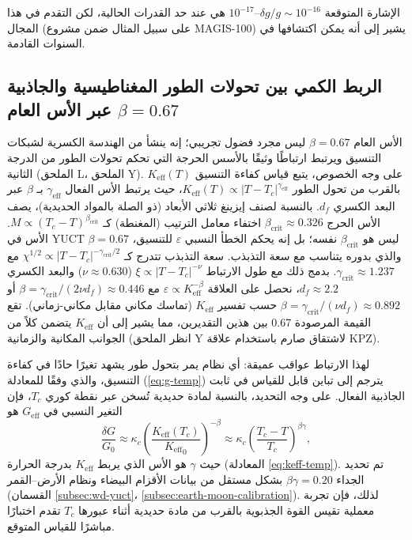 \documentclass[11pt,a4paper]{article}
\newcommand{\Keff}{K_{\mathrm{eff}}}
\begin{document}
	الإشارة المتوقعة $\delta g/g \sim 10^{-16}$–$10^{-17}$ هي عند حد القدرات الحالية، لكن التقدم في هذا المجال (على سبيل المثال ضمن مشروع MAGIS-100) يشير إلى أنه يمكن اكتشافها في السنوات القادمة.
	
	\subsection{الربط الكمي بين تحولات الطور المغناطيسية والجاذبية عبر الأس العام \(\beta = 0.67\)}
	\label{subsec:magnetic-gravity-link}
	
	الأس العام $\beta = 0.67$ ليس مجرد فضول تجريبي؛ إنه ينشأ من الهندسة الكسرية لشبكات التنسيق ويرتبط ارتباطًا وثيقًا بالأسس الحرجة التي تحكم تحولات الطور من الدرجة الثانية (الملحق L، الملحق Y). على وجه الخصوص، يتبع قياس كفاءة التنسيق $\Keff(T)$ بالقرب من تحول الطور $\Keff(T) \propto |T - T_c|^{\gamma_{\mathrm{eff}}}$، حيث يرتبط الأس الفعال $\gamma_{\mathrm{eff}}$ بـ $\beta$ عبر البعد الكسري $d_f$. بالنسبة لصنف إيزينغ ثلاثي الأبعاد (ذو الصلة بالمواد الحديدية)، يصف الأس الحرج $\beta_{\mathrm{crit}} \approx 0.326$ اختفاء معامل الترتيب (المغنطة) كـ $M \propto (T_c - T)^{\beta_{\mathrm{crit}}}$. الأس في YUCT $\beta = 0.67$ ليس هو $\beta_{\mathrm{crit}}$ نفسه؛ بل إنه يحكم الخطأ النسبي $\varepsilon$ للتنسيق، والذي بدوره يتناسب مع سعة التذبذب. سعة التذبذب تتدرج كـ $\chi^{1/2} \propto |T - T_c|^{-\gamma_{\mathrm{crit}}/2}$ مع $\gamma_{\mathrm{crit}} \approx 1.237$. بدمج ذلك مع طول الارتباط $\xi \propto |T - T_c|^{-\nu}$ ($\nu \approx 0.630$) والبعد الكسري $d_f \approx 2.2$، نحصل على العلاقة $\varepsilon \propto \Keff^{-\beta}$ مع $\beta = \gamma_{\mathrm{crit}}/(2\nu d_f) \approx 0.446$ أو $\beta = \gamma_{\mathrm{crit}}/(\nu d_f) \approx 0.892$ حسب تفسير $\Keff$ (تماسك مكاني مقابل مكاني-زماني). تقع القيمة المرصودة 0.67 بين هذين التقديرين، مما يشير إلى أن $\Keff$ يتضمن كلاً من الجوانب المكانية والزمانية (انظر الملحق Y لاشتقاق صارم باستخدام علاقة KPZ).
	
	لهذا الارتباط عواقب عميقة: أي نظام يمر بتحول طور يشهد تغيرًا حادًا في كفاءة التنسيق، والذي وفقًا للمعادلة (\ref{eq:g-temp}) يترجم إلى تباين قابل للقياس في ثابت الجاذبية الفعال. على وجه التحديد، بالنسبة لمادة حديدية تُسخن عبر نقطة كوري $T_c$، فإن التغير النسبي في $G_{\mathrm{eff}}$ هو
	\[
	\frac{\delta G}{G_0} \approx \kappa_c \left( \frac{\Keff(T_c)}{{\Keff}_{0}} \right)^{-\beta} \approx \kappa_c \left( \frac{T_c - T}{T_c} \right)^{\beta\gamma},
	\]
	حيث $\gamma$ هو الأس الذي يربط $\Keff$ بدرجة الحرارة (المعادلة \ref{eq:keff-temp}). تم تحديد الجداء $\beta\gamma = 0.20$ بشكل مستقل من بيانات الأقزام البيضاء ونظام الأرض–القمر (القسمان \ref{subsec:wd-yuct}، \ref{subsec:earth-moon-calibration}). لذلك، فإن تجربة معملية تقيس القوة الجذبوية بالقرب من مادة حديدية أثناء عبورها $T_c$ تقدم اختبارًا مباشرًا للقياس المتوقع.
	
\end{document}
